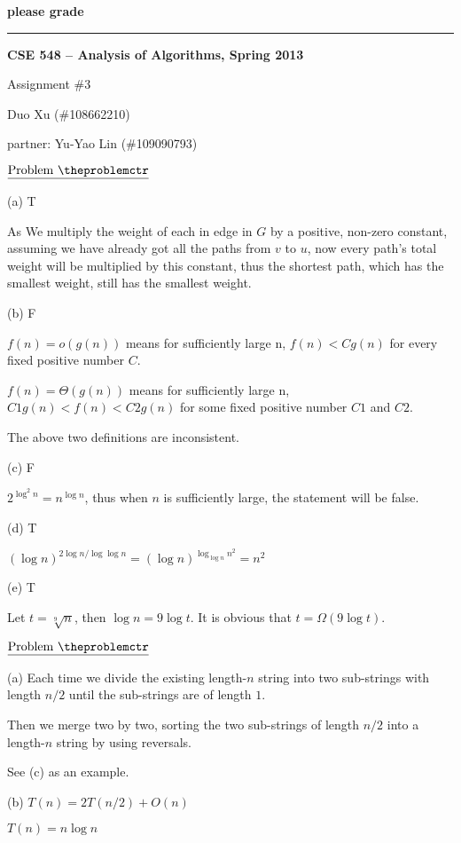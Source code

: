 \documentclass[11pt]{article}
\def\pp{\par\noindent}
\begin{document}
\centerline{\bf please grade}
\medskip
\hrule
\bigskip
\centerline{\bf CSE 548 -- Analysis of Algorithms, Spring 2013}
\medskip
\centerline{Assignment \#3}
\medskip
\centerline{Duo Xu (\#108662210)}
\medskip
\centerline{partner: Yu-Yao Lin (\#109090793)}
\bigskip
\bigskip


\addtocounter{problemctr}{1}
\bigskip
\noindent
$\underline{\rm Problem\ \theproblemctr}$\pp
\noindent
(a)  T

As We multiply the weight of each in edge in $G$ by a positive, non-zero constant, assuming we have already got all the paths from $v$ to $u$, now every path's total weight will be multiplied by this constant, thus the shortest path, which has the smallest weight, still has the smallest weight.


\bigskip
\bigskip
\noindent
(b) F

$f(n) = o(g(n))$ means for sufficiently large n, $f(n) < Cg(n)$ for every fixed positive number $C$.

$f(n) = \Theta(g(n))$ means for sufficiently large n, $C1g(n) < f(n) < C2g(n)$ for some fixed positive number $C1$ and $C2$.

The above two definitions are inconsistent.

\bigskip
\bigskip
\noindent
(c) F

$2^{\log^2 n} = n^{\log n}$, thus when $n$ is sufficiently large, the statement will be false.

\bigskip
\bigskip
\noindent
(d) T

$(\log n) ^{2\log n/\log \log n} = (\log n) ^{\log_{\log n} n^2} = n^2$

\bigskip
\bigskip
\noindent
(e) T

Let $t = \sqrt[9]{n}$, then $\log n = 9\log t$. It is obvious that $t = \Omega(9\log t)$.

\vfill
\newpage
\addtocounter{problemctr}{1}
\bigskip
\noindent
$\underline{\rm Problem\ \theproblemctr}$\pp
\noindent
(a) Each time we divide the existing length-$n$ string into two sub-strings with length $n/2$ until the sub-strings are of length $1$. 

Then we merge two by two, sorting the two sub-strings of length $n/2$ into a length-$n$ string by using reversals.

See (c) as an example.

\bigskip
\bigskip
\noindent
(b) $T(n) = 2T(n/2)+O(n)$

$T(n) = n\log n$
\end{document}
